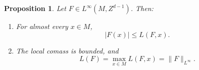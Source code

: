 \documentclass[reqno,11pt]{amsart}
\newcommand*\dif{\mathop{}\!\mathrm{d}}
\newcommand{\Chain}{\underline C}
\newtheorem{proposition}[theorem]{Proposition}
\theoremstyle{definition}
\numberwithin{equation}{section}
\begin{document}
\begin{proposition}\label{crandall}
Let $F \in L^\infty(M, Z^{d - 1})$. Then:
\begin{enumerate}
\item For almost every $x \in M$,
$$|F(x)| \leq L(F, x).$$
\label{crandall LDT}
\item The local comass is bounded, and \label{crandall linfinity}
$$L(F) = \max_{x \in M} L(F, x) = \|F\|_{L^\infty}.$$
\end{enumerate}
\end{proposition}
\end{document}
